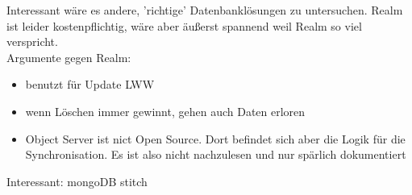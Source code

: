 % 
% 
% 
Interessant wäre es andere, 'richtige' Datenbanklösungen zu untersuchen. 
Realm ist leider kostenpflichtig, wäre aber äußerst spannend weil Realm so viel verspricht.\\
Argumente gegen Realm:
\begin{itemize}
  \item benutzt für Update LWW
  \item wenn Löschen immer gewinnt, gehen auch Daten erloren
  \item Object Server ist nict Open Source. Dort befindet sich aber die Logik für die Synchronisation. Es ist also nicht nachzulesen und nur spärlich dokumentiert
\end{itemize}
% 
% 
% 
Interessant: mongoDB stitch ~\cite{stitch}